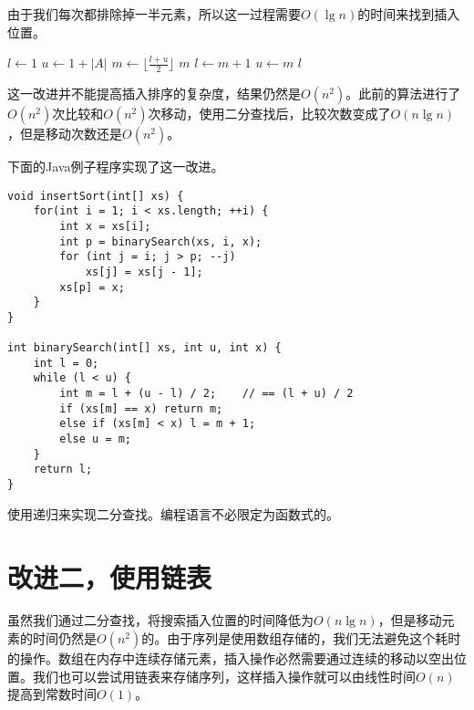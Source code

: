 \documentclass[UTF8]{article}
\begin{document}
由于我们每次都排除掉一半元素，所以这一过程需要$O(\lg n)$的时间来找到插入位置。

\begin{algorithmic}[1]
  \State $l \gets 1$
  \State $u \gets 1+|A|$
    \State $m \gets \lfloor \frac{l+u}{2} \rfloor$
      \State \Return $m$ 
      \State $l \gets m+1$
    \Else
      \State $u \gets m$
    \EndIf
  \EndWhile
  \State \Return $l$
\EndFunction
\end{algorithmic}

这一改进并不能提高插入排序的复杂度，结果仍然是$O(n^2)$。此前的算法进行了$O(n^2)$次比较和$O(n^2)$次移动，使用二分查找后，比较次数变成了$O(n \lg n)$，但是移动次数还是$O(n^2)$。

下面的Java例子程序实现了这一改进。

\lstset{language=Java}
\begin{lstlisting}
void insertSort(int[] xs) {
    for(int i = 1; i < xs.length; ++i) {
        int x = xs[i];
        int p = binarySearch(xs, i, x);
        for (int j = i; j > p; --j)
            xs[j] = xs[j - 1];
        xs[p] = x;
    }
}

int binarySearch(int[] xs, int u, int x) {
    int l = 0;
    while (l < u) {
        int m = l + (u - l) / 2;    // == (l + u) / 2
        if (xs[m] == x) return m;
        else if (xs[m] < x) l = m + 1;
        else u = m;
    }
    return l;
}
\end{lstlisting}

\begin{Exercise}
使用递归来实现二分查找。编程语言不必限定为函数式的。
\end{Exercise}


\section{改进二，使用链表}

虽然我们通过二分查找，将搜索插入位置的时间降低为$O(n \lg n)$，但是移动元素的时间仍然是$O(n^2)$的。由于序列是使用数组存储的，我们无法避免这个耗时的操作。数组在内存中连续存储元素，插入操作必然需要通过连续的移动以空出位置。我们也可以尝试用链表来存储序列，这样插入操作就可以由线性时间$O(n)$提高到常数时间$O(1)$。
\end{document}
